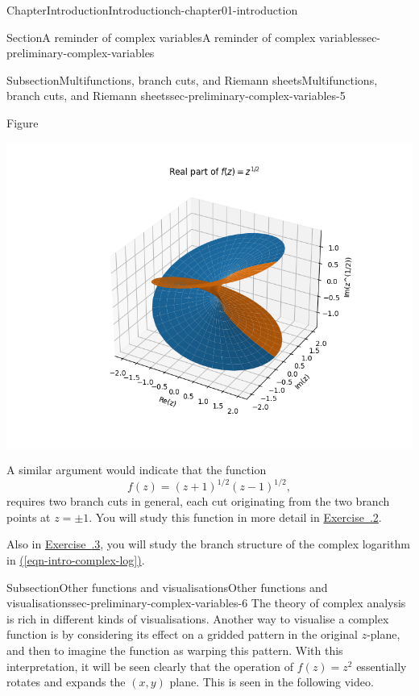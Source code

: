 \documentclass[oneside,10pt,]{book}
\newcommand{\xreffont}{\relax}
\numberwithin{equation}{section}
\begin{document}
\begin{chapterptx}{Chapter}{Introduction}{}{Introduction}{}{}{ch-chapter01-introduction}
\begin{sectionptx}{Section}{A reminder of complex variables}{}{A reminder of complex variables}{}{}{sec-preliminary-complex-variables}
\begin{subsectionptx}{Subsection}{Multifunctions, branch cuts, and Riemann sheets}{}{Multifunctions, branch cuts, and Riemann sheets}{}{}{sec-preliminary-complex-variables-5}
\begin{figureptx}{Figure}
\begin{image}{0}{1}{0}{}%
\includegraphics[width=\linewidth]{external/intro_sqrt_01.png}
\end{image}%
\tcblower
\end{figureptx}%
%
\par
A similar argument would indicate that the function%
\begin{equation}
f(z) = (z + 1)^{1/2} (z - 1)^{1/2},\label{eq-intro-twobranch}
\end{equation}
requires two branch cuts in general, each cut originating from the two branch points at \(z = \pm 1.\) You will study this function in more detail in \hyperlink{ex-branch1}{Exercise~{\xreffont 1.3.2}}.%
\par
Also in \hyperlink{ex-log}{Exercise~{\xreffont 1.3.3}}, you will study the branch structure of the complex logarithm in \hyperref[eqn-intro-complex-log]{({\xreffont\ref{eqn-intro-complex-log}})}.%
\end{subsectionptx}
%
%
\typeout{************************************************}
\typeout{************************************************}
%
\begin{subsectionptx}{Subsection}{Other functions and visualisations}{}{Other functions and visualisations}{}{}{sec-preliminary-complex-variables-6}
The theory of complex analysis is rich in different kinds of visualisations. Another way to visualise a complex function is by considering its effect on a gridded pattern in the original \(z\)-plane, and then to imagine the function as warping this pattern. With this interpretation, it will be seen clearly that the operation of \(f(z) = z^2\) essentially rotates and expands the \((x, y)\) plane. This is seen in the following video.%

\end{subsectionptx}
\end{sectionptx}
\end{chapterptx}
\end{document}
